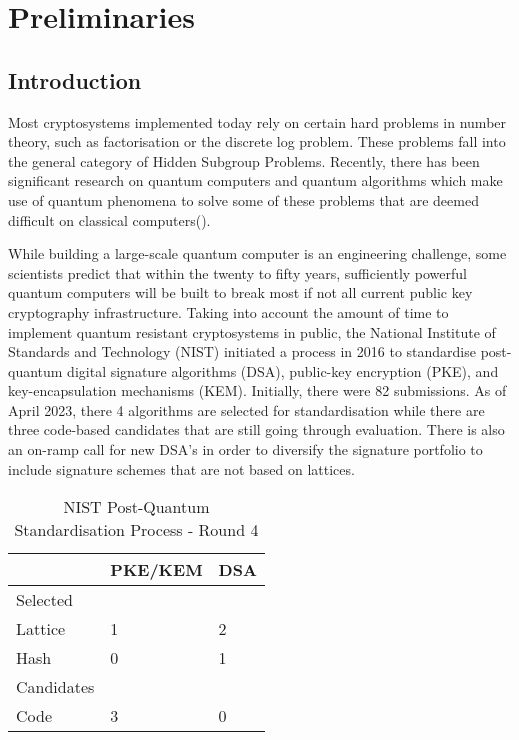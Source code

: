 \chapter{Preliminaries}


\section{Introduction}
Most cryptosystems implemented today rely on certain hard problems in number theory, such as factorisation or the discrete log problem. These problems fall into the general category of Hidden Subgroup Problems. Recently, there has been significant research on quantum computers and quantum algorithms which make use of quantum phenomena to solve some of these problems that are deemed difficult on classical computers(\cite{Shor,Jozsa}). 

While building a large-scale quantum computer is an engineering challenge, some scientists predict that within the twenty to fifty years, sufficiently powerful quantum computers will be built to break most if not all current public key cryptography infrastructure. Taking into account the amount of time to implement quantum resistant cryptosystems in public, the National Institute of Standards and Technology (NIST) initiated a process in 2016 to standardise post-quantum digital signature algorithms (DSA), public-key encryption (PKE), and key-encapsulation mechanisms (KEM). Initially, there were 82 submissions. As of April 2023, there 4 algorithms are selected for standardisation while there are three code-based candidates that are still going through evaluation. There is also an on-ramp call for new DSA's in order to diversify the signature portfolio to include signature schemes that are not based on lattices.

\begin{table}[]
\centering
\begin{tabular}{lll}
\hline
 & PKE/KEM & DSA \\ \hline
Selected &  &  \\ \hline
Lattice & 1 & 2 \\
Hash & 0 & 1 \\ \hline
Candidates &  &  \\ \hline
Code & 3 & 0 \\ \hline
\end{tabular}
\caption{NIST Post-Quantum Standardisation Process - Round 4}
\end{table}

